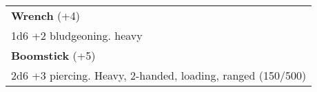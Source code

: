 \documentclass[twocolumn]{article}
\begin{document}
%

\vspace{40pt}

\\
\noindent\begin{tabular}{|m{3.1in}|}
\hline
\textbf{Wrench} (+4) \\
1d6 +2 bludgeoning. heavy\\
\textbf{Boomstick} (+5) \\
2d6 +3 piercing. Heavy, 2-handed, loading, ranged (150/500)\\

\hline
\end{tabular}
\vspace{8pt}
\end{document}

